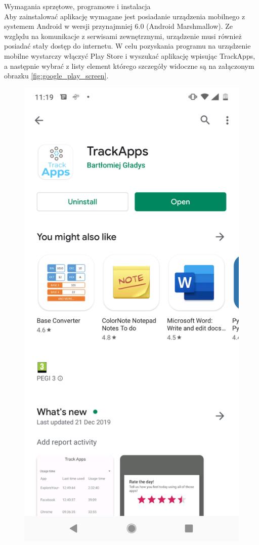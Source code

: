 \documentclass[a4paper,twoside,12pt]{book}
\begin{document}
\begin{description}
\item Wymagania sprzętowe, programowe i instalacja \hfill \\ 
Aby zainstalować aplikację wymagane jest posiadanie urządzenia mobilnego z systemem Android w wersji przynajmniej 6.0 (Android Marshmallow). Ze względu na komunikacje z serwisami zewnętrznymi, urządzenie musi również posiadać stały dostęp do internetu. W celu pozyskania programu na urządzenie mobilne wystarczy włączyć Play Store i wyszukać aplikację wpisując TrackApps, a następnie wybrać z listy element którego szczegóły widoczne są na załączonym obrazku
\ref{fig:google_play_screen}.

\begin{figure}[h!]
    \centering
    \includegraphics[scale=0.15]{images/google_play_screen.png}

\end{figure}
\end{description}
\end{document}
